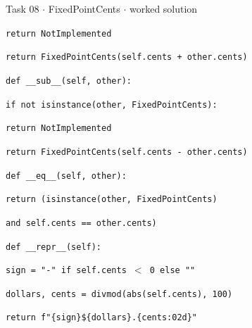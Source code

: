 \documentclass[11pt]{article}
\begin{document}
\begin{keepsection}
\begin{workedbox}{Task 08 \ensuremath{\cdot} FixedPointCents \ensuremath{\cdot} worked solution}
\begin{enumerate}
\begin{tcolorbox}[colback=Paperblue,colframe=Paperblue,boxrule=0pt,arc=0pt,left=7pt,right=7pt,top=5pt,bottom=5pt]
\noindent\hspace*{5em}\texttt{return NotImplemented}\par
\noindent\hspace*{3em}\texttt{return FixedPointCents(self.cents + other.cents)}\par
\noindent\hspace*{0em}\texttt{}\par
\noindent\hspace*{1em}\texttt{def \_\_sub\_\_(self, other):}\par
\noindent\hspace*{3em}\texttt{if not isinstance(other, FixedPointCents):}\par
\noindent\hspace*{5em}\texttt{return NotImplemented}\par
\noindent\hspace*{3em}\texttt{return FixedPointCents(self.cents - other.cents)}\par
\noindent\hspace*{0em}\texttt{}\par
\noindent\hspace*{1em}\texttt{def \_\_eq\_\_(self, other):}\par
\noindent\hspace*{3em}\texttt{return (isinstance(other, FixedPointCents)}\par
\noindent\hspace*{7em}\texttt{and self.cents == other.cents)}\par
\noindent\hspace*{0em}\texttt{}\par
\noindent\hspace*{1em}\texttt{def \_\_repr\_\_(self):}\par
\noindent\hspace*{3em}\texttt{sign = "-" if self.cents \ensuremath{<} 0 else ""}\par
\noindent\hspace*{3em}\texttt{dollars, cents = divmod(abs(self.cents), 100)}\par
\noindent\hspace*{3em}\texttt{return f"\{sign\}\$\{dollars\}.\{cents:02d\}"}\par
\end{tcolorbox}
\end{enumerate}
\end{workedbox}

\end{keepsection}
\end{document}
